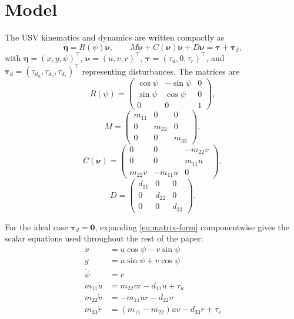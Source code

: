 \section{Model}

The USV kinematics and dynamics are written compactly as
\begin{equation}
\dot{\bm\eta} = R(\psi)\bm\nu, \qquad
M\dot{\bm\nu} + C(\bm\nu)\bm\nu + D\bm\nu = \bm\tau + \bm\tau_{d},
\label{eq:matrix-form}
\end{equation}
with $\bm\eta=(x,y,\psi)^\top$, $\bm\nu=(u,v,r)^\top$, $\bm\tau=(\tau_u,0,\tau_r)^\top$, and $\bm\tau_d=(\tau_{d_u},\tau_{d_v},\tau_{d_r})^\top$ representing disturbances. The matrices are
\begin{equation}
R(\psi)=\begin{pmatrix}\cos\psi&-\sin\psi&0\\\sin\psi&\cos\psi&0\\0&0&1\end{pmatrix},
\end{equation}
\begin{equation}
M=\begin{pmatrix}m_{11}&0&0\\0&m_{22}&0\\0&0&m_{33}\end{pmatrix},
\end{equation}
\begin{equation}
C(\bm\nu)=\begin{pmatrix}0&0&-m_{22}v\\0&0&m_{11}u\\m_{22}v&-m_{11}u&0\end{pmatrix},
\end{equation}
\begin{equation}
D=\begin{pmatrix}d_{11}&0&0\\0&d_{22}&0\\0&0&d_{33}\end{pmatrix}.
\end{equation}

For the ideal case $\bm\tau_d=\bm 0$, expanding \eqref{eq:matrix-form} componentwise gives the scalar equations used throughout the rest of the paper:
\begin{align}
\dot x &= u\cos\psi - v\sin\psi \label{eq:xdot}\\
\dot y &= u\sin\psi + v\cos\psi \label{eq:ydot}\\
\dot\psi &= r \label{eq:psidot}\\
m_{11}\dot u &= m_{22}vr - d_{11}u + \tau_u \label{eq:udot}\\
m_{22}\dot v &= -m_{11}ur - d_{22}v \label{eq:vdot}\\
m_{33}\dot r &= (m_{11}-m_{22})uv - d_{33}r + \tau_r \label{eq:rdot}
\end{align}

